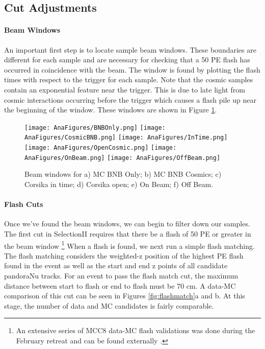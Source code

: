 \documentclass[12pt]{article}
\begin{document}
\subsection{Cut Adjustments}
\noindent \paragraph{Beam Windows} An important first step is to locate sample beam windows. These boundaries are different for each sample and are necessary for checking that a 50 PE flash has occurred in coincidence with the beam. The window is found by plotting the flash times with respect to the trigger for each sample.  Note that the cosmic samples contain an exponential feature near the trigger. This is due to late light from cosmic interactions occurring before the trigger which causes a flash pile up near the beginning of the window. These windows are shown in Figure \ref{fig:windows}.

\begin{figure}[h!]
\texttt{[image: AnaFigures/BNBOnly.png]}
\hspace{1 mm}
\texttt{[image: AnaFigures/CosmicBNB.png]}
\texttt{[image: AnaFigures/InTime.png]}
\hspace{1 mm}
\texttt{[image: AnaFigures/OpenCosmic.png]}
\texttt{[image: AnaFigures/OnBeam.png]}
\hspace{10 mm}
\texttt{[image: AnaFigures/OffBeam.png]}
\caption{Beam windows for a) MC BNB Only; b) MC BNB Cosmics; c) Corsika in time; d) Corsika open; e) On Beam; f) Off Beam. }
\label{fig:windows}
\end{figure}



\paragraph{Flash Cuts}
Once we've found the beam windows, we can begin to filter down our samples. The first cut in SelectionII requires that there be a flash of 50 PE or greater in the beam window \footnote{An extensive series of MCC8 data-MC flash validations was done during the February retreat and can be found externally \cite{bib:mcc8_val}.} When a flash is found, we next run a simple flash matching. The flash matching considers the weighted-z position of the highest PE flash found in the event as well as the start and end z points of all candidate pandoraNu tracks. For an event to pass the flash match cut, the maximum distance between start to flash or end to flash must be 70 cm. A data-MC comparison of this cut can be seen in Figures \ref{fig:flashmatch}a and b. At this stage, the number of data and MC candidates is fairly comparable.
\end{document}

